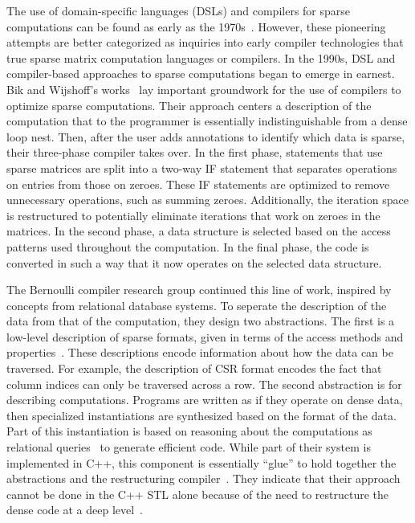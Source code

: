 The use of domain-specific languages (DSLs) and compilers for sparse computations can be found as early as the 1970s~\cite{calahan1971description,mchugh1974simpl}.
However, these pioneering attempts are better categorized as inquiries into early compiler technologies that true sparse matrix computation languages or compilers. 
In the 1990s, DSL and compiler-based approaches to sparse computations began to emerge in earnest.
Bik and Wijshoff's works~\cite{bik1993compilation, bik1993automatic,bik1996automatic} lay important groundwork for the use of compilers to optimize sparse computations.
Their approach centers a description of the computation that to the programmer is essentially indistinguishable from a dense loop nest. 
Then, after the user adds annotations to identify which data is sparse, their three-phase compiler takes over.
In the first phase, statements that use sparse matrices are split into a two-way IF statement that separates operations on entries from those on zeroes. 
These IF statements are optimized to remove unnecessary operations, such as summing zeroes.
Additionally, the iteration space is restructured to potentially eliminate iterations that work on zeroes in the matrices. 
In the second phase, a  data structure is selected based on the access patterns used throughout the computation. 
In the final phase, the code is converted in such a way that it now operates on the selected data structure.

The Bernoulli compiler research group continued this line of work, inspired by concepts from relational database systems. 
To seperate the description of the data from that of the computation, they design two abstractions.
The first is a low-level description of sparse formats, given in terms of the access methods and properties~\cite{kotlyar1997compiling}. 
These descriptions encode information about how the data can be traversed. 
For example, the description of CSR format encodes the fact that column indices can only be traversed across a row. 
The second abstraction is for describing computations.
Programs are written as if they operate on dense data, then specialized instantiations are synthesized based on the format of the data.
Part of this instantiation is based on reasoning about the computations as relational queries~\cite{kotlyar1997relational} to generate efficient code. 
While part of their system is implemented in C++, this component is essentially \enquote{glue} to hold together the abstractions and the restructuring compiler~\cite{mateev2000bernoulli}.
They indicate that their approach cannot be done in the C++ STL alone because of the need to restructure the dense code at a deep level~\cite{ahmed2000framework}.
\begin{figure}[h]
\begin{lstlisting}[caption={SpMV written using Bernoulli group representation.}]
  
\end{lstlisting}
\end{figure}
\cite{pugh1999sipr}
\cite{kessler1999sparamat}


